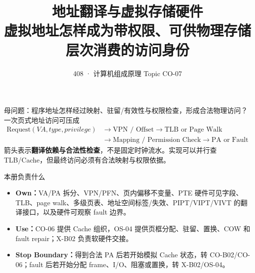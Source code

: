 \documentclass[UTF8,fontset=fandol,11pt,a4paper]{ctexart}
\title{\vspace{-1.1cm}\textbf{地址翻译与虚拟存储硬件}\\[0.4em]\large 虚拟地址怎样成为带权限、可供物理存储层次消费的访问身份}
\author{408 · 计算机组成原理 Topic CO-07}\date{}
\newcommand{\kw}[1]{\textbf{\color{deep}#1}}\newcommand{\code}[1]{\texttt{#1}}
\begin{document}
\maketitle

\begin{corebox}{母问题：程序地址怎样经过映射、驻留/有效性与权限检查，形成合法物理访问？}
一次页式地址访问可压成
\[
\boxed{
\begin{aligned}
\text{Request}(VA,type,privilege)
&\to\text{VPN / Offset}\to\text{TLB or Page Walk}\\
&\to\text{Mapping / Permission Check}\to\text{PA or Fault}
\end{aligned}}
\]
箭头表示\textbf{翻译依赖与合法性检查}，不是固定时钟流水。实现可以并行查 TLB/Cache，但最终访问必须有合法映射与权限依据。
\end{corebox}

\begin{methodbox}{本册负责什么}
\begin{itemize}
\item \kw{Own：}VA/PA 拆分、VPN/PFN、页内偏移不变量、PTE 硬件可见字段、TLB、page walk、多级页表、地址空间标签/失效、PIPT/VIPT/VIVT 的翻译接口，以及硬件可观察 fault 边界。
\item \kw{Use：}CO-06 提供 Cache 组织，OS-04 提供页框分配、驻留、置换、COW 和 fault repair；X-B02 负责软硬件交接。
\item \kw{Stop Boundary：}得到合法 PA 后若开始模拟 Cache 状态，转 CO-B02/CO-06；fault 后若开始分配 frame、I/O、阻塞或置换，转 X-B02/OS-04。
\end{itemize}
\end{methodbox}

\tableofcontents\newpage
\end{document}
